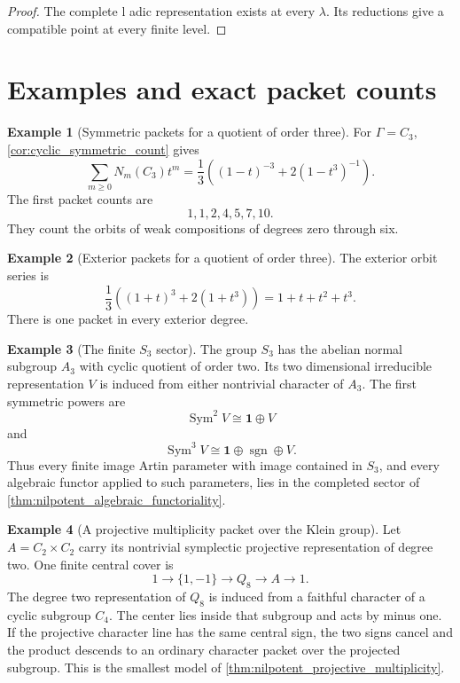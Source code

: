 \documentclass{aomart}
\theoremstyle{definition}
\newtheorem{example}[example]{Example}
\theoremstyle{remark}
\newcommand{\Sym}{\operatorname{Sym}}
\newcommand{\one}{\bm 1}
\begin{document}
\begin{proof}
The complete l adic representation exists at every \(\lambda\). Its reductions give a compatible point at every finite level.
\end{proof}

\section{Examples and exact packet counts}\label{sec:examples}

\begin{example}[Symmetric packets for a quotient of order three]\label{ex:symmetric_c3}
For \(\Gamma=C_3\), \cref{cor:cyclic_symmetric_count} gives
\[
\sum_{m\geq0}N_m(C_3)t^m
=
\frac13
\left(
(1-t)^{-3}
+2(1-t^3)^{-1}
\right).
\]
The first packet counts are
\[
1,1,2,4,5,7,10.
\]
They count the orbits of weak compositions of degrees zero through six.
\end{example}

\begin{example}[Exterior packets for a quotient of order three]\label{ex:exterior_c3}
The exterior orbit series is
\[
\frac13
\left(
(1+t)^3+2(1+t^3)
\right)
=
1+t+t^2+t^3.
\]
There is one packet in every exterior degree.
\end{example}

\begin{example}[The finite \(S_3\) sector]\label{ex:s3_sector}
The group \(S_3\) has the abelian normal subgroup \(A_3\) with cyclic quotient of order two. Its two dimensional irreducible representation \(V\) is induced from either nontrivial character of \(A_3\). The first symmetric powers are
\[
\Sym^2V\cong\one\oplus V
\]
and
\[
\Sym^3V\cong\one\oplus\operatorname{sgn}\oplus V.
\]
Thus every finite image Artin parameter with image contained in \(S_3\), and every algebraic functor applied to such parameters, lies in the completed sector of \cref{thm:nilpotent_algebraic_functoriality}.
\end{example}

\begin{example}[A projective multiplicity packet over the Klein group]\label{ex:v4_projective_packet}
Let \(A=C_2\times C_2\) carry its nontrivial symplectic projective representation of degree two. One finite central cover is
\[
1\longrightarrow\{1,-1\}
\longrightarrow Q_8
\longrightarrow A
\longrightarrow1.
\]
The degree two representation of \(Q_8\) is induced from a faithful character of a cyclic subgroup \(C_4\). The center lies inside that subgroup and acts by minus one. If the projective character line has the same central sign, the two signs cancel and the product descends to an ordinary character packet over the projected subgroup. This is the smallest model of \cref{thm:nilpotent_projective_multiplicity}.
\end{example}
\end{document}
